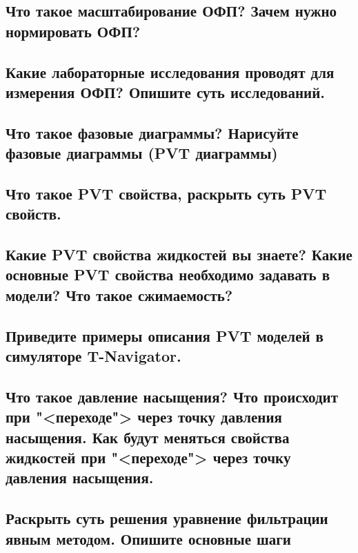 \documentclass[main.tex]{subfiles}
\begin{document}
\newpage

\subsection{Что такое масштабирование ОФП? Зачем нужно нормировать ОФП?}

\newpage

\subsection{Какие лабораторные исследования проводят для измерения ОФП? Опишите суть исследований.}

\newpage

\subsection{Что такое фазовые диаграммы? Нарисуйте фазовые диаграммы (PVT диаграммы)}

\newpage

\subsection{Что такое PVT свойства, раскрыть суть PVT свойств.}

\newpage

\subsection{Какие PVT свойства жидкостей вы знаете? Какие основные PVT свойства необходимо задавать в модели? Что такое сжимаемость?}

\newpage

\subsection{Приведите примеры описания PVT моделей в симуляторе T-Navigator.}

\newpage

\subsection{Что такое давление насыщения? Что происходит при "<переходе"> через  точку давления насыщения. Как будут меняться свойства жидкостей при "<переходе"> через  точку давления насыщения.}

\newpage

\subsection{Раскрыть суть решения уравнение фильтрации явным методом. Опишите основные шаги}
\end{document}
